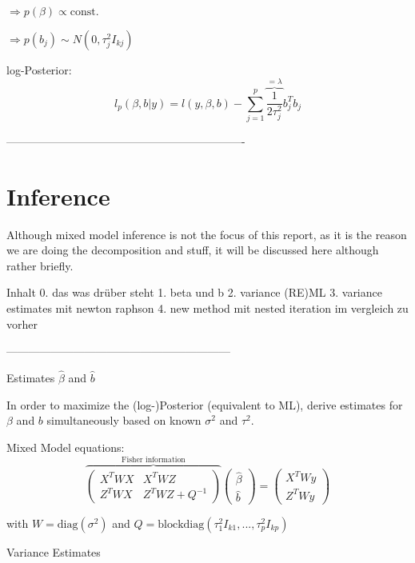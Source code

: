 \documentclass[12pt]{article}
\begin{document}
$\Rightarrow p(\beta) \propto \text{const.}$

$\Rightarrow p(b_j) \sim N(0,\tau_j^2I_{kj})$



log-Posterior:  $$l_p(\beta,b|y) = l(y,\beta,b) - \sum_{j=1}^p \overbrace{\frac{1}{2\tau_j^2}}^{=\lambda} b_j^T  b_j $$

----------------------------------------------------------------




\cite{fahrmeir2013regression}

\cite{kneib2006mixed}

\cite{wood2017generalized}

\cite{wood2011fast}


\section{Inference} %
Although mixed model inference is not the focus of this report, as it is the reason we are doing the decomposition and stuff, it will be discussed here although rather briefly.

Inhalt
0. das was drüber steht
1. beta und b
2. variance (RE)ML
3. variance estimates mit newton raphson
4. new method mit nested iteration im vergleich zu vorher

------------------------------------------------------------


Estimates $\hat{\beta}$ and $\hat{b}$

In order to maximize the (log-)Posterior (equivalent to ML), derive estimates for $\beta$ and $b$ simultaneously based on known $\sigma^2$ and $\tau^2$.


Mixed Model equations:
$$\overbrace{\begin{pmatrix}
X^TWX & X^TWZ \\
Z^TWX & Z^TWZ + Q^{-1}
\end{pmatrix}}^{\text{Fisher information}}
\begin{pmatrix}
\hat{\beta} \\
\hat{b}
\end{pmatrix} =
\begin{pmatrix}
X^TWy \\
Z^TWy
\end{pmatrix}$$

 with $W=\text{diag}(\sigma^2)$ and $Q=\text{blockdiag}(\tau_1^2I_{k1},..., \tau_p^2I_{kp})$


Variance Estimates
\end{document}
